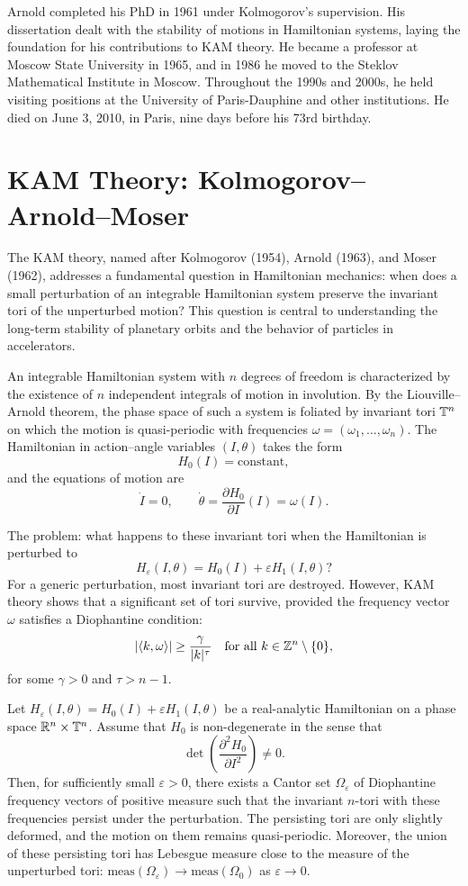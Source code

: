 Arnold completed his PhD in 1961 under Kolmogorov's supervision. His dissertation dealt with the stability of motions in Hamiltonian systems, laying the foundation for his contributions to KAM theory. He became a professor at Moscow State University in 1965, and in 1986 he moved to the Steklov Mathematical Institute in Moscow. Throughout the 1990s and 2000s, he held visiting positions at the University of Paris-Dauphine and other institutions. He died on June 3, 2010, in Paris, nine days before his 73rd birthday.

\section{KAM Theory: Kolmogorov--Arnold--Moser}

The KAM theory, named after Kolmogorov (1954), Arnold (1963), and Moser (1962), addresses a fundamental question in Hamiltonian mechanics: when does a small perturbation of an integrable Hamiltonian system preserve the invariant tori of the unperturbed motion? This question is central to understanding the long-term stability of planetary orbits and the behavior of particles in accelerators.

An integrable Hamiltonian system with \(n\) degrees of freedom is characterized by the existence of \(n\) independent integrals of motion in involution. By the Liouville--Arnold theorem, the phase space of such a system is foliated by invariant tori \(\mathbb{T}^n\) on which the motion is quasi-periodic with frequencies \(\omega = (\omega_1,\dots,\omega_n)\). The Hamiltonian in action--angle variables \((I,\theta)\) takes the form
\[
H_0(I) = \text{constant},
\]
and the equations of motion are
\[
\dot{I} = 0, \qquad \dot{\theta} = \frac{\partial H_0}{\partial I}(I) = \omega(I).
\]

The problem: what happens to these invariant tori when the Hamiltonian is perturbed to
\[
H_\varepsilon(I,\theta) = H_0(I) + \varepsilon H_1(I,\theta)?
\]
For a generic perturbation, most invariant tori are destroyed. However, KAM theory shows that a significant set of tori survive, provided the frequency vector \(\omega\) satisfies a Diophantine condition:
\[
|\langle k,\omega\rangle| \geq \frac{\gamma}{|k|^\tau} \quad \text{for all } k \in \mathbb{Z}^n \setminus \{0\},
\]
for some \(\gamma > 0\) and \(\tau > n - 1\).

\begin{theorem}
Let \(H_\varepsilon(I,\theta) = H_0(I) + \varepsilon H_1(I,\theta)\) be a real-analytic Hamiltonian on a phase space \(\mathbb{R}^n \times \mathbb{T}^n\). Assume that \(H_0\) is non-degenerate in the sense that
\[
\det\left(\frac{\partial^2 H_0}{\partial I^2}\right) \neq 0.
\]
Then, for sufficiently small \(\varepsilon > 0\), there exists a Cantor set \(\Omega_\varepsilon\) of Diophantine frequency vectors of positive measure such that the invariant \(n\)-tori with these frequencies persist under the perturbation. The persisting tori are only slightly deformed, and the motion on them remains quasi-periodic. Moreover, the union of these persisting tori has Lebesgue measure close to the measure of the unperturbed tori: \(\text{meas}(\Omega_\varepsilon) \to \text{meas}(\Omega_0)\) as \(\varepsilon \to 0\).
\end{theorem}

